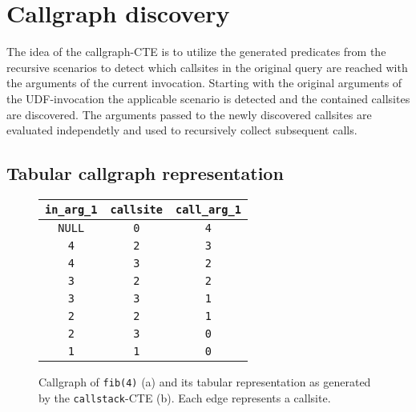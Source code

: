 \section{Callgraph discovery}

The idea of the callgraph-CTE is to utilize the generated predicates from the recursive scenarios to detect which callsites in the original query are reached with the arguments of the current invocation.
Starting with the original arguments of the UDF-invocation the applicable scenario is detected and the contained callsites are discovered. The arguments passed to the newly discovered callsites are evaluated independetly and used to recursively collect subsequent calls.

\subsection{Tabular callgraph representation}

\begin{figure}[h!]\small
    \begin{minipage}[b]{.5\linewidth}
    \centering
    
    \label{fig:fib_callstack_graph}
    \end{minipage}%
    \begin{minipage}[b]{.5\linewidth}
    \centering
     
    \begin{tabular}{c|c|c}
        \texttt{in\_arg\_1} & \texttt{callsite} & \texttt{call\_arg\_1} \\
        \hline
        \hline
        \texttt{NULL} & \texttt{0} & \texttt{4}\\
        \texttt{4} & \texttt{2} & \texttt{3}\\
        \texttt{4} & \texttt{3} & \texttt{2}\\
        \hline
        \hline
        \texttt{3} & \texttt{2} & \texttt{2}\\
        \texttt{3} & \texttt{3} & \texttt{1}\\
        \texttt{2} & \texttt{2} & \texttt{1}\\
        \texttt{2} & \texttt{3} & \texttt{0}\\
        \hline
        \texttt{1} & \texttt{1} & \texttt{0}\\
        \hline
    \end{tabular}
    \label{fig:fib_callstack_table}
    \end{minipage}
    \caption{Callgraph of \texttt{fib(4)} (a) and its tabular representation as generated by the \texttt{callstack}-CTE (b). Each edge represents a callsite.}\label{fig:fib_callstack}
\end{figure}

